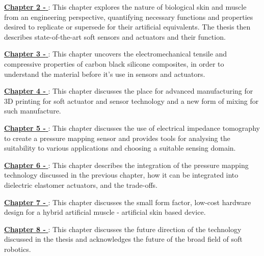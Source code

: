 \hyperref[chapter2]{\textbf{Chapter 2 - \chapiiname}}: This chapter explores the nature of biological skin and muscle from an engineering perspective, quantifying necessary functions and properties desired to replicate or supersede for their artificial equivalents. The thesis then describes state-of-the-art soft sensors and actuators and their function.

\hyperref[chapter3]{\textbf{Chapter 3 - \chapiiiname}}: This chapter uncovers the electromechanical tensile and compressive properties of carbon black silicone composites, in order to understand the material before it's use in sensors and actuators.

\hyperref[chapter4]{\textbf{Chapter 4 - \chapivname}}: This chapter discusses the place for advanced manufacturing for 3D printing for soft actuator and sensor technology and a new form of mixing for such manufacture.

\hyperref[chapter5]{\textbf{Chapter 5 - \chapvname}}: This chapter discusses the use of electrical impedance tomography to create a pressure mapping sensor and provides tools for analysing the suitability to various applications and choosing a suitable sensing domain.

\hyperref[chapter6]{\textbf{Chapter 6 - \chapviname}}: This chapter describes the integration of the pressure mapping technology discussed in the previous chapter, how it can be integrated into dielectric elastomer actuators, and the trade-offs.

\hyperref[chapter7]{\textbf{Chapter 7 - \chapviiname}}: This chapter discusses the small form factor, low-cost hardware design for a hybrid artificial muscle - artificial skin based device.

\hyperref[chapter8]{\textbf{Chapter 8 - \chapviiiname}}: This chapter discusses the future direction of the technology discussed in the thesis and acknowledges the future of the broad field of soft robotics.